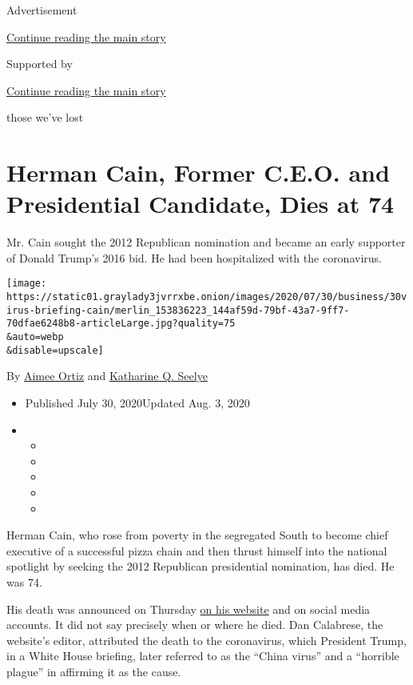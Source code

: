 Advertisement

\protect\hyperlink{after-top}{Continue reading the main story}

Supported by

\protect\hyperlink{after-sponsor}{Continue reading the main story}

those we've lost

\hypertarget{herman-cain-former-ceo-and-presidential-candidate-dies-at-74}{%
\section{Herman Cain, Former C.E.O. and Presidential Candidate, Dies at
74}\label{herman-cain-former-ceo-and-presidential-candidate-dies-at-74}}

Mr. Cain sought the 2012 Republican nomination and became an early
supporter of Donald Trump's 2016 bid. He had been hospitalized with the
coronavirus.

\texttt{[image: https://static01.graylady3jvrrxbe.onion/images/2020/07/30/business/30virus-briefing-cain/merlin\_153836223\_144af59d-79bf-43a7-9ff7-70dfae6248b8-articleLarge.jpg?quality=75\\\&auto=webp\\\&disable=upscale]}

By \href{https://www.nytimes3xbfgragh.onion/by/aimee-ortiz}{Aimee Ortiz}
and
\href{https://www.nytimes3xbfgragh.onion/by/katharine-q-seelye}{Katharine
Q. Seelye}

\begin{itemize}
\item
  Published July 30, 2020Updated Aug. 3, 2020
\item
  \begin{itemize}
  \item
  \item
  \item
  \item
  \item
  \end{itemize}
\end{itemize}

Herman Cain, who rose from poverty in the segregated South to become
chief executive of a successful pizza chain and then thrust himself into
the national spotlight by seeking the 2012 Republican presidential
nomination, has died. He was 74.

His death was announced on Thursday
\href{https://hermancain.com/heartbroken-world-poorer-herman-cain-gone-lord/?utm_source=twitter\&utm_medium=thenewvoice\&utm_content=2020-07-30}{on
his website} and on social media accounts. It did not say precisely when
or where he died. Dan Calabrese, the website's editor, attributed the
death to the coronavirus, which President Trump, in a White House
briefing, later referred to as the ``China virus'' and a ``horrible
plague'' in affirming it as the cause.

